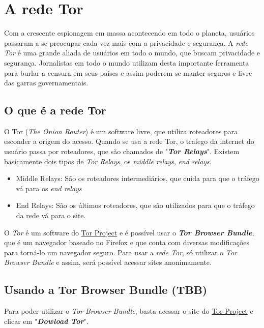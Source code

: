 \documentclass[12pt, letterpaper, Monospace:12]{report}
\begin{document}
\section{A rede Tor}
	Com a crescente espionagem em massa acontecendo em todo o planeta, usuários passaram a se preocupar cada vez mais com a privacidade e segurança. A \textit{rede Tor} é uma grande aliada de usuários em todo o mundo, que buscam privacidade e segurança. Jornalistas em todo o mundo utilizam desta importante ferramenta para burlar a censura em seus países e assim poderem se manter seguros e livre das garras governamentais.\\

\subsection{O que é a rede Tor}
	O Tor (\textit{The Onion Router}) é um software livre, que utiliza roteadores para esconder a origem do acesso. Quando se usa a rede Tor, o trafego da internet do usuário passa por roteadores, que são chamados de "\textbf{\textit{Tor Relays}}". Existem basicamente dois tipos de \textit{Tor Relays}, os \textit{middle relays}, \textit{end relays}.

	\begin{itemize}
		\item Middle Relays: São os roteadores intermediários, que cuida para que o tráfego vá para os \textit{end relays}
		\item End Relays: São os últimos roteadores, que são utilizados para que o tráfego da rede vá para o site.
	\end{itemize}

	O \textit{Tor} é um software do \href{http://torproject.org/}{Tor Project} e é possível usar o \textbf{\textit{Tor Browser Bundle}}, que é um navegador baseado no Firefox e que conta com diversas modificações para torná-lo um navegador seguro. Para usar a \textit{rede Tor}, só utilizar o \textit{Tor Browser Bundle} e assim, será possível acessar sites anonimamente.\\

\subsection{Usando a Tor Browser Bundle (TBB)}
	Para poder utilizar o \textit{Tor Browser Bundle}, basta acessar o site do \href{http://torproject.org/}{Tor Project} e clicar em "\textit{\textbf{Dowload Tor}}".
\end{document}
